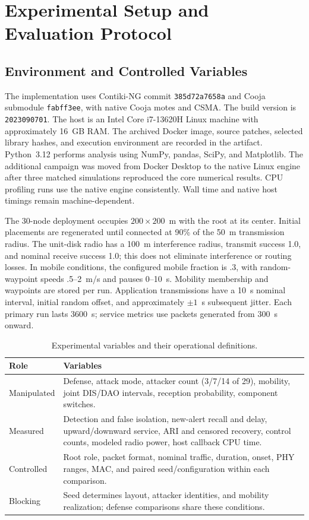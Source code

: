 \section{Experimental Setup and Evaluation Protocol}\label{sec:setup}
\subsection{Environment and Controlled Variables}
The implementation uses Contiki-NG commit \texttt{385d72a7658a} and Cooja submodule \texttt{fabff3ee}, with native Cooja motes and CSMA. The build version is \texttt{2023090701}. The host is an Intel Core i7-13620H Linux machine with approximately 16~GB RAM. The archived Docker image, source patches, selected library hashes, and execution environment are recorded in the artifact. Python~3.12 performs analysis using NumPy, pandas, SciPy, and Matplotlib. The additional campaign was moved from Docker Desktop to the native Linux engine after three matched simulations reproduced the core numerical results. CPU profiling runs use the native engine consistently. Wall time and native host timings remain machine-dependent.

The 30-node deployment occupies $200\times200$~m with the root at its center. Initial placements are regenerated until connected at 90\% of the 50~m transmission radius. The unit-disk radio has a 100~m interference radius, transmit success 1.0, and nominal receive success 1.0; this does not eliminate interference or routing losses. In mobile conditions, the configured mobile fraction is .3, with random-waypoint speeds .5--2~m/s and pauses 0--10~s. Mobility membership and waypoints are stored per run. Application transmissions have a 10~s nominal interval, initial random offset, and approximately $\pm1$~s subsequent jitter. Each primary run lasts 3600~s; service metrics use packets generated from 300~s onward.

\begin{table}[t]
\caption{Experimental variables and their operational definitions.}\label{tab:variables}
\centering\footnotesize
\begin{tabularx}{\columnwidth}{@{}lX@{}}\toprule
Role & Variables \\\midrule
Manipulated & Defense, attack mode, attacker count (3/7/14 of 29), mobility, joint DIS/DAO intervals, reception probability, component switches.\\
Measured & Detection and false isolation, new-alert recall and delay, upward/downward service, ARI and censored recovery, control counts, modeled radio power, host callback CPU time.\\
Controlled & Root role, packet format, nominal traffic, duration, onset, PHY ranges, MAC, and paired seed/configuration within each comparison.\\
Blocking & Seed determines layout, attacker identities, and mobility realization; defense comparisons share these conditions.\\\bottomrule
\end{tabularx}
\end{table}

